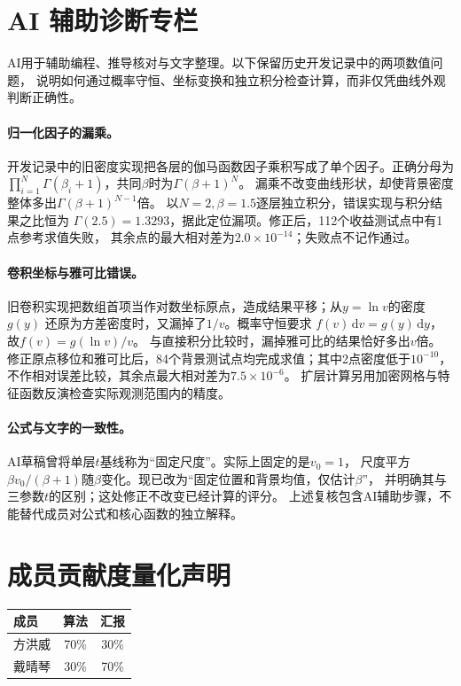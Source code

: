 \documentclass[11pt,a4paper]{article}
\begin{document}
\clearpage
\noindent\begin{minipage}[t][0.5\textheight][t]{\textwidth}
\section{AI 辅助诊断专栏}\label{sec:ai_audit}
AI用于辅助编程、推导核对与文字整理。以下保留历史开发记录中的两项数值问题，
说明如何通过概率守恒、坐标变换和独立积分检查计算，而非仅凭曲线外观判断正确性。

\paragraph{归一化因子的漏乘。}
开发记录中的旧密度实现把各层的伽马函数因子乘积写成了单个因子。正确分母为
$\prod_{i=1}^N\Gamma(\beta_i+1)$，共同$\beta$时为$\Gamma(\beta+1)^N$。
漏乘不改变曲线形状，却使背景密度整体多出$\Gamma(\beta+1)^{N-1}$倍。
以$N=2,\beta=1.5$逐层独立积分，错误实现与积分结果之比恒为
$\Gamma(2.5)=1.3293$，据此定位漏项。修正后，112个收益测试点中有1点参考求值失败，
其余点的最大相对差为$2.0\times10^{-14}$；失败点不记作通过。


\paragraph{卷积坐标与雅可比错误。}
旧卷积实现把数组首项当作对数坐标原点，造成结果平移；从$y=\ln v$的密度$g(y)$
还原为方差密度时，又漏掉了$1/v$。概率守恒要求
$f(v)\,\mathrm dv=g(y)\,\mathrm dy$，故$f(v)=g(\ln v)/v$。
与直接积分比较时，漏掉雅可比的结果恰好多出$v$倍。
修正原点移位和雅可比后，84个背景测试点均完成求值；其中2点密度低于$10^{-10}$，
不作相对误差比较，其余点最大相对差为$7.5\times10^{-6}$。
扩层计算另用加密网格与特征函数反演检查实际观测范围内的精度。

\paragraph{公式与文字的一致性。}
AI草稿曾将单层$t$基线称为“固定尺度”。实际上固定的是$v_0=1$，
尺度平方$\beta v_0/(\beta+1)$随$\beta$变化。现已改为“固定位置和背景均值，仅估计$\beta$”，
并明确其与三参数$t$的区别；这处修正不改变已经计算的评分。
上述复核包含AI辅助步骤，不能替代成员对公式和核心函数的独立解释。
\end{minipage}

\section{成员贡献度量化声明}\label{sec:contributions}
\begin{center}
\setlength{\tabcolsep}{20pt}
\begin{tabular}{lcc}\toprule
成员 & 算法 & 汇报\\\midrule
方洪威 & 70\% & 30\%\\
戴晴琴 & 30\% & 70\%\\\bottomrule
\end{tabular}
\end{center}
\end{document}
